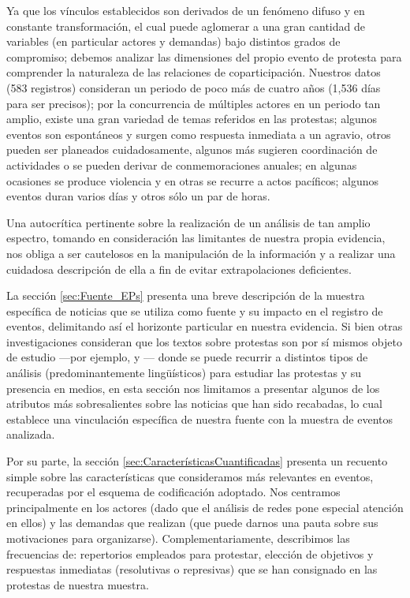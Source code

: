 \documentclass[letterpaper, 11pt]{book}
\theoremstyle{definition}
\theoremstyle{remark}
\begin{document}
Ya que los vínculos establecidos son derivados de un fenómeno difuso y en constante transformación, el cual puede aglomerar a una gran cantidad de variables (en particular actores y demandas) bajo distintos grados de compromiso; debemos analizar las dimensiones del propio evento de protesta para comprender la naturaleza de las relaciones de coparticipación. 
Nuestros datos (583 registros) consideran un periodo de poco más de cuatro años (1,536 días para ser precisos); por la concurrencia de múltiples actores en un periodo tan amplio, existe una gran variedad de temas referidos en las protestas; algunos eventos son espontáneos y surgen como respuesta inmediata a un agravio, otros pueden ser planeados cuidadosamente, algunos más sugieren coordinación de actividades o se pueden derivar de conmemoraciones anuales; en algunas ocasiones se produce violencia y en otras se recurre a actos pacíficos; algunos eventos duran varios días y otros sólo un par de horas. 

Una autocrítica pertinente sobre la realización de un análisis de tan amplio espectro, tomando en consideración las limitantes de nuestra propia evidencia, nos obliga a ser cautelosos en la manipulación de la información y a realizar una cuidadosa descripción de ella a fin de evitar extrapolaciones deficientes. 


La sección \ref{sec:Fuente_EPs} presenta una breve descripción de la muestra específica de noticias que se utiliza como fuente y su impacto en el registro de eventos, delimitando así el horizonte particular en nuestra evidencia. 
Si bien otras investigaciones consideran que los textos sobre protestas son por sí mismos objeto de estudio ---por ejemplo, \citet{2015_Danilova_Linguistic} y \citet{2010_Franzosi_QNA}--- donde se puede recurrir a distintos tipos de análisis (predominantemente lingüísticos) para estudiar las protestas y su presencia en medios, en esta sección nos limitamos a presentar algunos de los atributos más sobresalientes sobre las noticias que han sido recabadas, lo cual establece una vinculación específica de nuestra fuente con la muestra de eventos analizada. 


Por su parte, la sección \ref{sec:CaracterísticasCuantificadas} presenta un recuento simple sobre las características que consideramos más relevantes en eventos, recuperadas por el esquema de codificación adoptado. 
Nos centramos principalmente en los actores (dado que el análisis de redes pone especial atención en ellos) y las demandas que realizan (que puede darnos una pauta sobre sus motivaciones para organizarse). 
Complementariamente, describimos las frecuencias de: repertorios empleados para protestar, elección de objetivos y respuestas inmediatas (resolutivas o represivas) que se han consignado en las protestas de nuestra muestra. 
\end{document}
